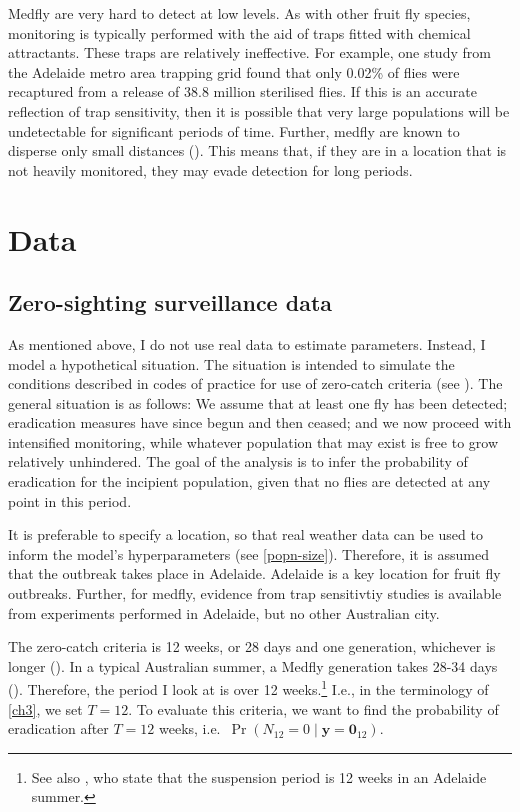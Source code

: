 \documentclass[
  oneside]{book}
\begin{document}
Medfly are very hard to detect at low levels. As with other fruit fly species, monitoring is typically performed with the aid of traps fitted with chemical attractants. These traps are relatively ineffective. For example, one study from the Adelaide metro area trapping grid found that only 0.02\% of flies were recaptured from a release of 38.8 million sterilised flies. If this is an accurate reflection of trap sensitivity, then it is possible that very large populations will be undetectable for significant periods of time. Further, medfly are known to disperse only small distances (\citet{meats2007}). This means that, if they are in a location that is not heavily monitored, they may evade detection for long periods.

\hypertarget{data}{%
\section{Data}\label{data}}

\hypertarget{zero-sighting-surveillance-data}{%
\subsection{Zero-sighting surveillance data}\label{zero-sighting-surveillance-data}}

As mentioned above, I do not use real data to estimate parameters. Instead, I model a hypothetical situation. The situation is intended to simulate the conditions described in codes of practice for use of zero-catch criteria (see \citet{supptraps}). The general situation is as follows: We assume that at least one fly has been detected; eradication measures have since begun and then ceased; and we now proceed with intensified monitoring, while whatever population that may exist is free to grow relatively unhindered. The goal of the analysis is to infer the probability of eradication for the incipient population, given that no flies are detected at any point in this period.

It is preferable to specify a location, so that real weather data can be used to inform the model's hyperparameters (see \ref{popn-size}). Therefore, it is assumed that the outbreak takes place in Adelaide. Adelaide is a key location for fruit fly outbreaks. Further, for medfly, evidence from trap sensitivtiy studies is available from experiments performed in Adelaide, but no other Australian city.

The zero-catch criteria is 12 weeks, or 28 days and one generation, whichever is longer (\citet{meats2005}). In a typical Australian summer, a Medfly generation takes 28-34 days (\citet{dpirdwa}). Therefore, the period I look at is over 12 weeks.\footnote{See also \citet{PIRSA}, who state that the suspension period is 12 weeks in an Adelaide summer.} I.e., in the terminology of \ref{ch3}, we set \(T = 12\). To evaluate this criteria, we want to find the probability of eradication after \(T=12\) weeks, i.e.~\(\Pr(N_{12} = 0 \mid \mathbf y = \mathbf 0_{12})\).
\end{document}
